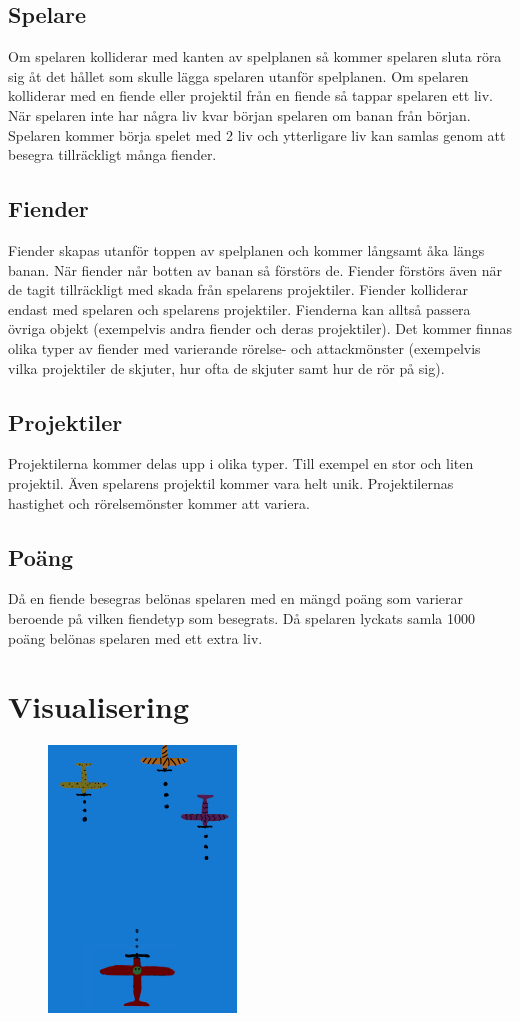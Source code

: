 \documentclass{TDP005mall}
\begin{document}
\subsection{Spelare}
Om spelaren kolliderar med kanten av spelplanen så kommer spelaren sluta röra sig åt det hållet som skulle lägga spelaren utanför spelplanen. 
Om spelaren kolliderar med en fiende eller projektil från en fiende så tappar spelaren ett liv.
När spelaren inte har några liv kvar början spelaren om banan från början.
Spelaren kommer börja spelet med 2 liv och ytterligare liv kan samlas genom att besegra tillräckligt många fiender.

\subsection{Fiender}
Fiender skapas utanför toppen av spelplanen och kommer långsamt åka längs banan. 
När fiender når botten av banan så förstörs de. Fiender förstörs även när de tagit tillräckligt med skada från spelarens projektiler.
Fiender kolliderar endast med spelaren och spelarens projektiler. Fienderna kan alltså passera övriga objekt (exempelvis andra fiender och deras projektiler).
Det kommer finnas olika typer av fiender med varierande rörelse- och attackmönster (exempelvis vilka projektiler de skjuter, hur ofta de skjuter samt hur de rör på sig).

\subsection{Projektiler}
Projektilerna kommer delas upp i olika typer. Till exempel en stor och liten projektil. Även spelarens projektil kommer vara helt unik.
Projektilernas hastighet och rörelsemönster kommer att variera.

\subsection{Poäng}
Då en fiende besegras belönas spelaren med en mängd poäng som varierar beroende på vilken fiendetyp som besegrats.
Då spelaren lyckats samla 1000 poäng belönas spelaren med ett extra liv.

\section{Visualisering}

\begin{figure}[H]
  \centering
  \includegraphics[width=5cm]{Dogeater.png}
\end{figure}
\end{document}
